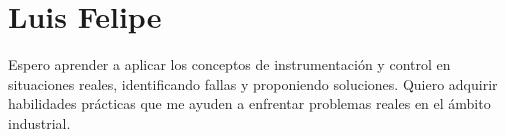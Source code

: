 \section{Luis Felipe}
Espero aprender a aplicar los conceptos de instrumentación y control en situaciones reales, identificando fallas y proponiendo soluciones. Quiero adquirir habilidades prácticas que me ayuden a enfrentar problemas reales en el ámbito industrial.